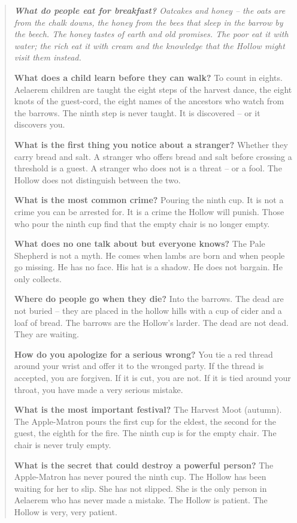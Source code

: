 \documentclass[12pt,oneside]{book}
\newenvironment{almanac}
  {\begin{quote}\small\itshape}
  {\end{quote}}
\begin{document}
\vspace{1em}
\begin{almanac}
\textbf{What do people eat for breakfast?} Oatcakes and honey -- the oats are from the chalk downs, the honey from the bees that sleep in the barrow by the beech. The honey tastes of earth and old promises. The poor eat it with water; the rich eat it with cream and the knowledge that the Hollow might visit them instead.

\textbf{What does a child learn before they can walk?} To count in eights. Aelaerem children are taught the eight steps of the harvest dance, the eight knots of the guest-cord, the eight names of the ancestors who watch from the barrows. The ninth step is never taught. It is discovered -- or it discovers you.

\textbf{What is the first thing you notice about a stranger?} Whether they carry bread and salt. A stranger who offers bread and salt before crossing a threshold is a guest. A stranger who does not is a threat -- or a fool. The Hollow does not distinguish between the two.

\textbf{What is the most common crime?} Pouring the ninth cup. It is not a crime you can be arrested for. It is a crime the Hollow will punish. Those who pour the ninth cup find that the empty chair is no longer empty.

\textbf{What does no one talk about but everyone knows?} The Pale Shepherd is not a myth. He comes when lambs are born and when people go missing. He has no face. His hat is a shadow. He does not bargain. He only collects.

\textbf{Where do people go when they die?} Into the barrows. The dead are not buried -- they are placed in the hollow hills with a cup of cider and a loaf of bread. The barrows are the Hollow's larder. The dead are not dead. They are waiting.

\textbf{How do you apologize for a serious wrong?} You tie a red thread around your wrist and offer it to the wronged party. If the thread is accepted, you are forgiven. If it is cut, you are not. If it is tied around your throat, you have made a very serious mistake.

\textbf{What is the most important festival?} The Harvest Moot (autumn). The Apple-Matron pours the first cup for the eldest, the second for the guest, the eighth for the fire. The ninth cup is for the empty chair. The chair is never truly empty.

\textbf{What is the secret that could destroy a powerful person?} The Apple-Matron has never poured the ninth cup. The Hollow has been waiting for her to slip. She has not slipped. She is the only person in Aelaerem who has never made a mistake. The Hollow is patient. The Hollow is very, very patient.
\end{almanac}
\end{document}
